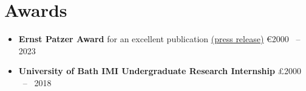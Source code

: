 \section*{Awards}

\begin{itemize}
    \item \textbf{Ernst Patzer Award} for an excellent publication \href{https://www.mpia.de/6083451/2023_11_Patzer_E?c=5297512}{(press release)} \hfill \euro{}2000 ~--~ 2023
    \item \textbf{University of Bath IMI Undergraduate Research Internship} \hfill £2000 ~--~ 2018
\end{itemize}